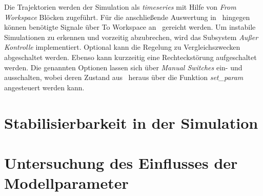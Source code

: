 Die Trajektorien werden der Simulation als \textit{timeseries} mit Hilfe von \textit{From Workspace} Blöcken zugeführt. Für die anschließende Auswertung in \Matlab\ hingegen können benötigte Signale über To Workspace an \Matlab\ gereicht werden. Um instabile Simulationen zu erkennen und vorzeitig abzubrechen, wird das Subsystem \textit{Außer Kontrolle} implementiert. Optional kann die Regelung zu Vergleichszwecken abgeschaltet werden. Ebenso kann kurzzeitig eine Rechteckstörung aufgeschaltet werden. Die genannten Optionen lassen sich über \textit{Manual Switches} ein- und ausschalten, wobei deren Zustand aus \Matlab\ heraus über die Funktion \textit{set\_param} angesteuert werden kann.

\section{Stabilisierbarkeit in der Simulation}

\section{Untersuchung des Einflusses der Modellparameter}\label{sec:trjparamtest}

